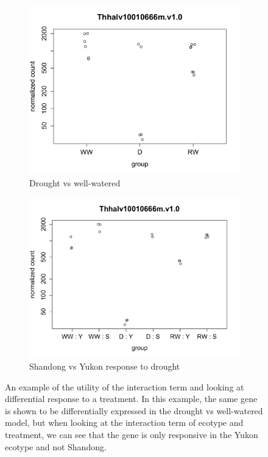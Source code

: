 \documentclass[12pt]{article}
\begin{document}
	\begin{figure}[H]
		\centering
		\begin{subfigure}[b]{1\textwidth}
			\centering
			\includegraphics[trim=1cm 0 0 0,scale=0.55]{../figures/dww_plot.pdf}
			\caption{Drought vs well-watered}
		\end{subfigure}
		\begin{subfigure}[b]{1\textwidth}
			\centering
			\includegraphics[trim=1cm 0 0 0,scale=0.55]{../figures/sy_d_plot.pdf}
			\caption{Shandong vs Yukon response to drought}
		\end{subfigure}	
		\caption[Expression response plots]{An example of the utility of the interaction term and looking at differential response to a treatment. In this example, the same gene is shown to be differentially expressed in the drought vs well-watered model, but when looking at the interaction term of ecotype and treatment, we can see that the gene is only responsive in the Yukon ecotype and not Shandong.}
		\label{count_plot_example}	
	\end{figure}
		
\end{document}
